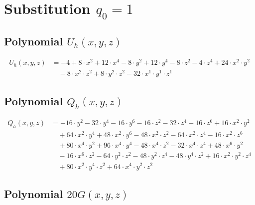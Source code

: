 \section{Substitution $q_0=1$}
\subsection{Polynomial $U_h(x,y,z)$}
\begin{align*}U_h(x,y,z)&=-4+8\cdot x^{2}+12\cdot x^{4}-8\cdot y^{2}+12\cdot y^{4}-8\cdot z^{2}-4\cdot z^{4}+24\cdot x^{2}\cdot y^{2}\\
&\quad -8\cdot x^{2}\cdot z^{2}+8\cdot y^{2}\cdot z^{2}-32\cdot x^{1}\cdot y^{1}\cdot z^{1}\end{align*}\subsection{Polynomial $Q_h(x,y,z)$}
\begin{align*}Q_h(x,y,z)&=-16\cdot y^{2}-32\cdot y^{4}-16\cdot y^{6}-16\cdot z^{2}-32\cdot z^{4}-16\cdot z^{6}+16\cdot x^{2}\cdot y^{2}\\
&\quad +64\cdot x^{2}\cdot y^{4}+48\cdot x^{2}\cdot y^{6}-48\cdot x^{2}\cdot z^{2}-64\cdot x^{2}\cdot z^{4}-16\cdot x^{2}\cdot z^{6}\\
&\quad +80\cdot x^{4}\cdot y^{2}+96\cdot x^{4}\cdot y^{4}-48\cdot x^{4}\cdot z^{2}-32\cdot x^{4}\cdot z^{4}+48\cdot x^{6}\cdot y^{2}\\
&\quad -16\cdot x^{6}\cdot z^{2}-64\cdot y^{2}\cdot z^{2}-48\cdot y^{2}\cdot z^{4}-48\cdot y^{4}\cdot z^{2}+16\cdot x^{2}\cdot y^{2}\cdot z^{4}\\
&\quad +80\cdot x^{2}\cdot y^{4}\cdot z^{2}+64\cdot x^{4}\cdot y^{2}\cdot z^{2}\end{align*}\subsection{Polynomial $20G(x,y,z)$}
